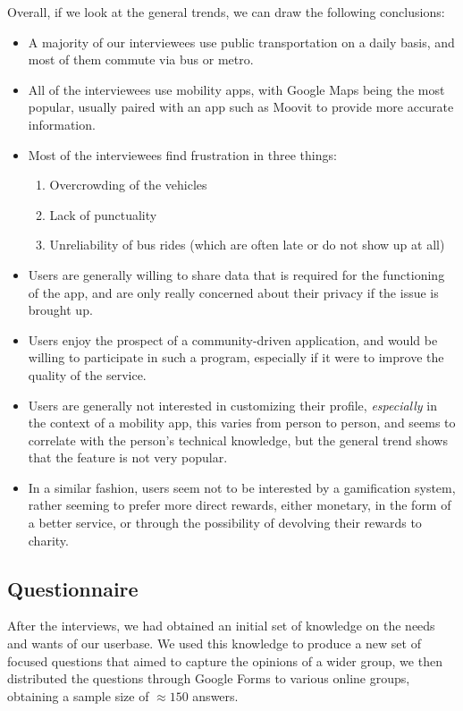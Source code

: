 \documentclass[a4paper, 11pt]{report}
\begin{document}
Overall, if we look at the general trends, we can draw the following conclusions:

\begin{itemize}
	\item A majority of our interviewees use public transportation on a daily basis, and most of
	      them commute via bus or metro.
	\item All of the interviewees use mobility apps, with Google Maps being the most popular,
	      usually paired with an app such as Moovit to provide more accurate information.
	\item Most of the interviewees find frustration in three things:
	      \begin{enumerate}
		      \item Overcrowding of the vehicles
		      \item Lack of punctuality
		      \item Unreliability of bus rides (which are often late or do not show up at all)
	      \end{enumerate}
	\item Users are generally willing to share data that is required for the functioning of the app,
	      and are only really concerned about their privacy if the issue is brought up.
	\item Users enjoy the prospect of a community-driven application, and would be willing to
	      participate in such a program, especially if it were to improve the quality of the service.
	\item Users are generally not interested in customizing their profile, \emph{especially}
	      in the context of a mobility app, this varies from person to person, and seems to correlate
	      with the person's technical knowledge, but the general trend shows that the feature is not
	      very popular.
	\item In a similar fashion, users seem not to be interested by a gamification system, rather
	      seeming to prefer more direct rewards, either monetary, in the form of a better service, or through
	      the possibility of devolving their rewards to charity.
\end{itemize}

\subsection{Questionnaire}\label{ssec:questionnaire}

After the interviews, we had obtained an initial set of knowledge on the needs and wants of
our userbase. We used this knowledge to produce a new set of focused questions that aimed
to capture the opinions of a wider group, we then distributed the questions through
Google Forms to various online groups, obtaining a sample size of $\approx150$ answers.
\end{document}
